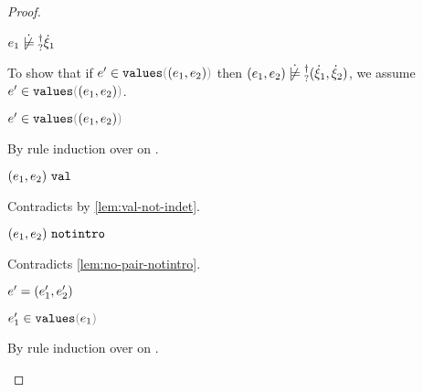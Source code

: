 \begin{proof}
\begin{byCases}
\begin{byCases}
\begin{byCases}
        \begin{byCases}
          \item[\cnotsatisfyormay{e_1}{\hxi_1}]
          \begin{pfsteps*}
          \item $\cnotsatisfyormay{e_1}{\hxi_1}$  
          \end{pfsteps*}
          To show that if $\inValues{e'}{\hpair{e_1}{e_2}}$ then $\cnotsatisfyormay{\hpair{e_1}{e_2}}{\cpair{\hxi_1}{\hxi_2}}$, we assume $\inValues{e'}{\hpair{e_1}{e_2}}$.
          \begin{pfsteps*}
          \item $\inValues{e'}{\hpair{e_1}{e_2}}$  
          \end{pfsteps*}
          By rule induction over  on .
          \begin{byCases}
            \item[\text{(\ref{rule:IVVal})}]
            \begin{pfsteps*}
            \item $(e_1 , e_2) ~\mathtt{val}$ 
            \end{pfsteps*} 
            Contradicts  by \autoref{lem:val-not-indet}.
            \item[\text{(\ref{rule:IVIndet})}] 
            \begin{pfsteps*}
            \item $(e_1 , e_2) ~\mathtt{notintro}$ 
            \end{pfsteps*}
            Contradicts \autoref{lem:no-pair-notintro}.
            \item[\text{(\ref{rule:IVPair})}]
            \begin{pfsteps*}
            \item $e'=(e_1' , e_2')$ 
            \item $\inValues{e_1'}{e_1}$  
            \end{pfsteps*}
            By rule induction over  on .
            \begin{byCases}
              \item[\text{(\ref{rule:IVVal})}]

\end{byCases}
\end{byCases}
\end{byCases}
\end{byCases}
\end{byCases}
\end{byCases}
\end{proof}
